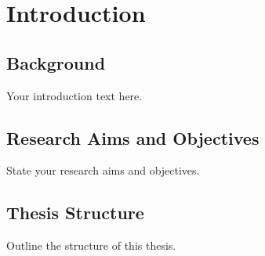 \chapter{Introduction}
\label{chap:introduction}

\section{Background}

Your introduction text here.

\section{Research Aims and Objectives}

State your research aims and objectives.

\section{Thesis Structure}

Outline the structure of this thesis.
